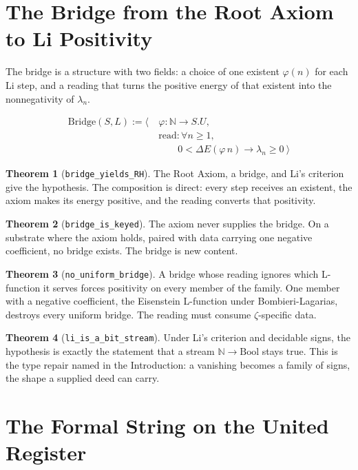 \documentclass[10pt]{article}
\begin{document}
\hypertarget{the-bridge-from-the-root-axiom-to-li-positivity}{%
\section{The Bridge from the Root Axiom to Li
Positivity}\label{the-bridge-from-the-root-axiom-to-li-positivity}}

The bridge is a structure with two fields: a choice of one existent
\(\varphi(n)\) for each Li step, and a reading that turns the positive
energy of that existent into the nonnegativity of \(\lambda_n\).

\[\begin{aligned}\mathrm{Bridge}(S, L) := \big\langle\ &\varphi : \mathbb N \to S.U,\\ &\mathrm{read} : \forall n \geq 1,\\ &\qquad 0 < \Delta E(\varphi\, n) \to \lambda_n \geq 0 \ \big\rangle\end{aligned}\]

\textbf{Theorem 1} (\texttt{bridge\_yields\_RH}). The Root Axiom, a
bridge, and Li's criterion give the hypothesis. The composition is
direct: every step receives an existent, the axiom makes its energy
positive, and the reading converts that positivity.

\textbf{Theorem 2} (\texttt{bridge\_is\_keyed}). The axiom never
supplies the bridge. On a substrate where the axiom holds, paired with
data carrying one negative coefficient, no bridge exists. The bridge is
new content.

\textbf{Theorem 3} (\texttt{no\_uniform\_bridge}). A bridge whose
reading ignores which L-function it serves forces positivity on every
member of the family. One member with a negative coefficient, the
Eisenstein L-function under Bombieri-Lagarias, destroys every uniform
bridge. The reading must consume \(\zeta\)-specific data.

\textbf{Theorem 4} (\texttt{li\_is\_a\_bit\_stream}). Under Li's
criterion and decidable signs, the hypothesis is exactly the statement
that a stream \(\mathbb N \to \mathrm{Bool}\) stays true. This is the
type repair named in the Introduction: a vanishing becomes a family of
signs, the shape a supplied deed can carry.

\hypertarget{the-formal-string-on-the-united-register}{%
\section{The Formal String on the United
Register}\label{the-formal-string-on-the-united-register}}
\end{document}
